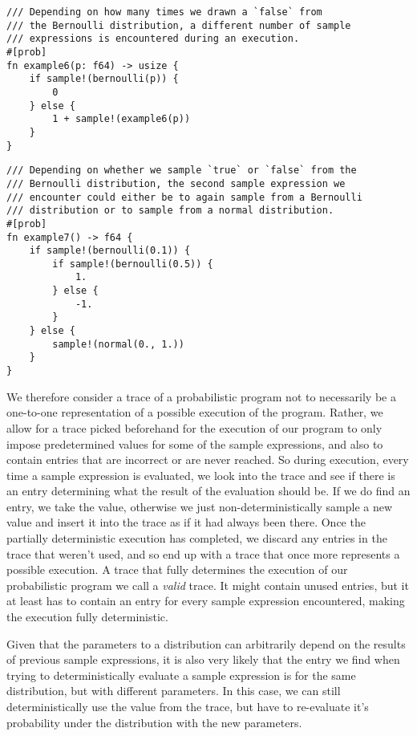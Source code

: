 \begin{minipage}{\linewidth}
\begin{lstlisting}
/// Depending on how many times we drawn a `false` from
/// the Bernoulli distribution, a different number of sample
/// expressions is encountered during an execution.
#[prob]
fn example6(p: f64) -> usize {
    if sample!(bernoulli(p)) {
        0
    } else {
        1 + sample!(example6(p))
    }
}
\end{lstlisting}
\end{minipage}


\begin{minipage}{\linewidth}
\begin{lstlisting}
/// Depending on whether we sample `true` or `false` from the
/// Bernoulli distribution, the second sample expression we
/// encounter could either be to again sample from a Bernoulli
/// distribution or to sample from a normal distribution. 
#[prob]
fn example7() -> f64 {
    if sample!(bernoulli(0.1)) {
        if sample!(bernoulli(0.5)) {
            1.
        } else {
            -1.
        }
    } else {
        sample!(normal(0., 1.))
    }
}
\end{lstlisting}
\end{minipage}

We therefore consider a trace of a probabilistic program not to necessarily be a one-to-one representation of a possible execution of the program. Rather, we allow for a trace picked beforehand for the execution of our program to only impose predetermined values for some of the sample expressions, and also to contain entries that are incorrect or are never reached. So during execution, every time a sample expression is evaluated, we look into the trace and see if there is an entry determining what the result of the evaluation should be. If we do find an entry, we take the value, otherwise we just non-deterministically sample a new value and insert it into the trace as if it had always been there. Once the partially deterministic execution has completed, we discard any entries in the trace that weren't used, and so end up with a trace that once more represents a possible execution. A trace that fully determines the execution of our probabilistic program we call a \textit{valid} trace. It might contain unused entries, but it at least has to contain an entry for every sample expression encountered, making the execution fully deterministic.

Given that the parameters to a distribution can arbitrarily depend on the results of previous sample expressions, it is also very likely that the entry we find when trying to deterministically evaluate a sample expression is for the same distribution, but with different parameters. In this case, we can still deterministically use the value from the trace, but have to re-evaluate it's probability under the distribution with the new parameters.

